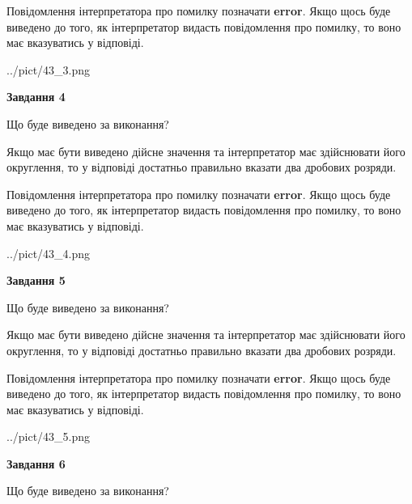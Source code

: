 \documentclass[12pt, ukrainian]{article}
\begin{document}
{\begin {Large}
Повідомлення інтерпретатора про помилку позначати \textbf{error}.
Якщо щось буде виведено до того, як інтерпретатор видасть повідомлення про помилку, 
то воно має вказуватись у відповіді. \par

\begin{center}
	{../pict/43_3.png}
\end{center}
\newpage

{\begin {center}\textbf{Завдання 4}\end {center}}\par
Що буде виведено за виконання? \par

Якщо має бути виведено дійсне значення та інтерпретатор має здійснювати його округлення, 
то у відповіді достатньо правильно вказати два дробових розряди.

Повідомлення інтерпретатора про помилку позначати \textbf{error}.
Якщо щось буде виведено до того, як інтерпретатор видасть повідомлення про помилку, 
то воно має вказуватись у відповіді. \par

\begin{center}
	{../pict/43_4.png}
\end{center}
\newpage

{\begin {center}\textbf{Завдання 5}\end {center}}\par
Що буде виведено за виконання? \par

Якщо має бути виведено дійсне значення та інтерпретатор має здійснювати його округлення, 
то у відповіді достатньо правильно вказати два дробових розряди.

Повідомлення інтерпретатора про помилку позначати \textbf{error}.
Якщо щось буде виведено до того, як інтерпретатор видасть повідомлення про помилку, 
то воно має вказуватись у відповіді. \par

\begin{center}
	{../pict/43_5.png}
\end{center}
\newpage

{\begin {center}\textbf{Завдання 6}\end {center}}\par
Що буде виведено за виконання? \par


\end{Large}}
\end{document}
